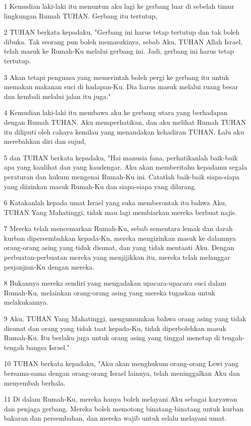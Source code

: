 \par 1 Kemudian laki-laki itu menuntun aku lagi ke gerbang luar di sebelah timur lingkungan Rumah TUHAN. Gerbang itu tertutup,
\par 2 TUHAN berkata kepadaku, "Gerbang ini harus tetap tertutup dan tak boleh dibuka. Tak seorang pun boleh memasukinya, sebab Aku, TUHAN Allah Israel, telah masuk ke Rumah-Ku melalui gerbang ini. Jadi, gerbang ini harus tetap tertutup.
\par 3 Akan tetapi penguasa yang memerintah boleh pergi ke gerbang itu untuk memakan makanan suci di hadapan-Ku. Dia harus masuk melalui ruang besar dan kembali melalui jalan itu juga."
\par 4 Kemudian laki-laki itu membawa aku ke gerbang utara yang berhadapan dengan Rumah TUHAN. Aku memperhatikan, dan aku melihat Rumah TUHAN itu diliputi oleh cahaya kemilau yang menandakan kehadiran TUHAN. Lalu aku merebahkan diri dan sujud,
\par 5 dan TUHAN berkata kepadaku, "Hai manusia fana, perhatikanlah baik-baik apa yang kaulihat dan yang kaudengar. Aku akan memberitahu kepadamu segala peraturan dan hukum mengenai Rumah-Ku ini. Catatlah baik-baik siapa-siapa yang diizinkan masuk Rumah-Ku dan siapa-siapa yang dilarang.
\par 6 Katakanlah kepada umat Israel yang suka memberontak itu bahwa Aku, TUHAN Yang Mahatinggi, tidak mau lagi membiarkan mereka berbuat najis.
\par 7 Mereka telah mencemarkan Rumah-Ku, sebab sementara lemak dan darah kurban dipersembahkan kepada-Ku, mereka mengizinkan masuk ke dalamnya orang-orang asing yang tidak disunat, dan yang tidak mentaati Aku. Dengan perbuatan-perbuatan mereka yang menjijikkan itu, mereka telah melanggar perjanjian-Ku dengan mereka.
\par 8 Bukannya mereka sendiri yang mengadakan upacara-upacara suci dalam Rumah-Ku, melainkan orang-orang asing yang mereka tugaskan untuk melakukannya.
\par 9 Aku, TUHAN Yang Mahatinggi, mengumumkan bahwa orang asing yang tidak disunat dan orang yang tidak taat kepada-Ku, tidak diperbolehkan masuk Rumah-Ku. Itu berlaku juga untuk orang asing yang tinggal menetap di tengah-tengah bangsa Israel."
\par 10 TUHAN berkata kepadaku, "Aku akan menghukum orang-orang Lewi yang bersama-sama dengan orang-orang Israel lainnya, telah meninggalkan Aku dan menyembah berhala.
\par 11 Di dalam Rumah-Ku, mereka hanya boleh melayani Aku sebagai karyawan dan penjaga gerbang. Mereka boleh memotong binatang-binatang untuk kurban bakaran dan persembahan, dan mereka wajib untuk selalu melayani umat.
